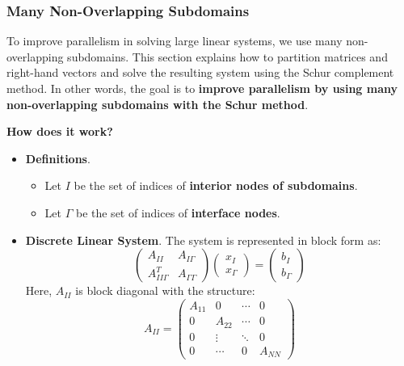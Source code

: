 \subsubsection{Many Non-Overlapping Subdomains}

To improve parallelism in solving large linear systems, we use many non-\break overlapping subdomains. This section explains how to partition matrices and right-hand vectors and solve the resulting system using the Schur complement method. In other words, the goal is to \textbf{improve parallelism by using many non-overlapping subdomains with the Schur method}.

\highspace
\begin{flushleft}
    \textcolor{Green3}{ \textbf{How does it work?}}
\end{flushleft}
\begin{itemize}
    \item \textbf{Definitions}.
    \begin{itemize}
        \item Let $I$ be the set of indices of \textbf{interior nodes of subdomains}.
        \item Let $\Gamma$ be the set of indices of \textbf{interface nodes}.
    \end{itemize}

    \item \textbf{Discrete Linear System}. The system is represented in block form as:
    \begin{equation*}
        \begin{pmatrix}
            A_{II} & A_{I\Gamma} \\
            A_{II\Gamma}^{T} & A_{\Gamma \Gamma}
        \end{pmatrix}
        \begin{pmatrix}
            x_{I} \\ x_{\Gamma}
        \end{pmatrix}
        =
        \begin{pmatrix}
            b_{I} \\ b_{\Gamma}
        \end{pmatrix}
    \end{equation*}
    Here, $A_{II}$ is block diagonal with the structure:
    \begin{equation*}
        A_{II} = \begin{pmatrix}
            A_{11}  & 0         & \cdots    & 0         \\
            0       & A_{22}    & \cdots    & 0         \\
            0       & \vdots    & \ddots    & 0         \\
            0       & \cdots    & 0         & A_{NN}
        \end{pmatrix}
    \end{equation*}


\end{itemize}
